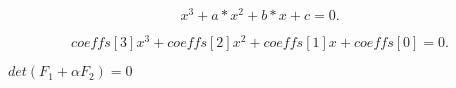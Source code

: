 \documentclass{article}
\begin{document}
\[ x^3 + a*x^2 + b*x + c = 0. \]
\pagebreak

\[ coeffs[3] x^3 + coeffs[2] x^2 + coeffs[1] x + coeffs[0] = 0. \]
\pagebreak

$det(F_1 + \alpha F_2) = 0$
\pagebreak
\end{document}
